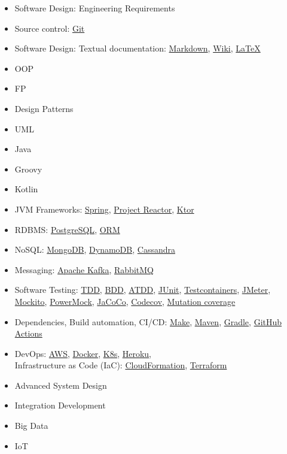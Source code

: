 \documentclass[nobrand,anonymous,nodate,nosecurity]{huawei}
\begin{document}
{\begin{itemize}
\item Software Design: Engineering Requirements
\item Source control:
	\href{https://git-scm.com}{Git}
\item Software Design: Textual documentation:
	\href{https://en.wikipedia.org/wiki/Markdown}{Markdown},
	\href{https://en.wikipedia.org/wiki/Wiki}{Wiki},
	\href{https://en.wikipedia.org/wiki/LaTeX}{LaTeX}
\item OOP
\item FP
\item Design Patterns
\item UML
\item Java
\item Groovy
\item Kotlin
\item JVM Frameworks:
	\href{https://spring.io}{Spring},
	\href{https://projectreactor.io}{Project Reactor},
	\href{https://ktor.io}{Ktor}
\item RDBMS:
	\href{https://www.postgresql.org.pl}{PostgreSQL},
	\href{https://www.wikiwand.com/en/Object%E2%80%93relational_mapping}{ORM}
\item NoSQL:
	\href{https://www.mongodb.com}{MongoDB},
	\href{https://aws.amazon.com/dynamodb/}{DynamoDB},
	\href{https://cassandra.apache.org/_/index.html}{Cassandra}
\item Messaging:
	\href{https://kafka.apache.org}{Apache Kafka},
	\href{https://www.rabbitmq.com}{RabbitMQ}
\item Software Testing:
	\href{}{TDD},
	\href{}{BDD},
	\href{}{ATDD},
	\href{https://junit.org/}{JUnit},
	\href{https://www.testcontainers.org}{Testcontainers},
	\href{https://jmeter.apache.org}{JMeter},
	\href{https://site.mockito.org}{Mockito},
	\href{https://github.com/powermock/powermock}{PowerMock},
	\href{https://www.eclemma.org/jacoco/}{JaCoCo},
	\href{codecov.io/}{Codecov},
	\href{}{Mutation coverage}
\item Dependencies, Build automation, CI/CD:
	\href{https://en.wikipedia.org/wiki/Make_(software)}{Make},
	\href{https://maven.apache.org}{Maven},
	\href{https://gradle.org}{Gradle},
	\href{https://gradle.org}{GitHub Actions}
\item DevOps:
\href{https://aws.amazon.com/}{AWS},
\href{https://www.docker.com}{Docker},
\href{https://kubernetes.io}{K8s},
\href{https://www.heroku.com}{Heroku},
\\
Infrastructure as Code (IaC):
\href{https://aws.amazon.com/cloudformation/}{CloudFormation},
\href{https://www.terraform.io}{Terraform}
\item Advanced System Design
\item Integration Development
\item Big Data
\item IoT
\end{itemize}

}
\end{document}
